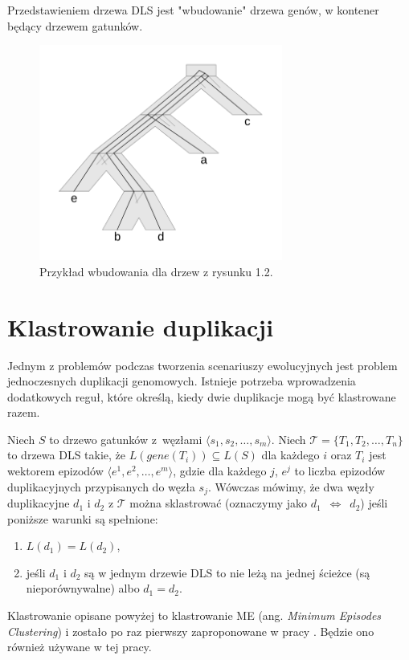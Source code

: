 \documentclass[licencjacka]{pracamgr}
\begin{document}
Przedstawieniem drzewa DLS jest "wbudowanie" drzewa genów, w kontener będący drzewem gatunków. 


\begin{figure}[H]
  \centering
  \includegraphics[width=80mm]{./pictures/optscen.png}
  \caption{Przykład wbudowania dla drzew z rysunku 1.2.}
\end{figure}

\section{Klastrowanie duplikacji}

Jednym z problemów podczas tworzenia scenariuszy ewolucyjnych jest problem jednoczesnych duplikacji genomowych. Istnieje potrzeba wprowadzenia dodatkowych reguł, które określą, kiedy dwie duplikacje mogą być klastrowane razem. 
 
Niech $S$ to drzewo gatunków z~węzłami $\langle s_1,s_2, \dots , s_m \rangle$.
Niech $\mathcal{T}=\{T_1,T_2, \dots , T_n\}$ to drzewa DLS takie, że $L(gene(T_i)) \subseteq L(S)$ dla każdego $i$ oraz $T_i$ jest wektorem epizodów $\langle e^1,e^2, \dots , e^m \rangle$, gdzie dla każdego $j$, $e^j$ to liczba epizodów duplikacyjnych przypisanych do węzła $s_j$. Wówczas mówimy, że dwa węzły duplikacyjne $d_1$ i $d_2$ z $\mathcal{T}$ można sklastrować (oznaczymy jako $d_1$~$\Longleftrightarrow$~$d_2$)  jeśli poniższe warunki są spełnione:
\begin{enumerate}
\item $L(d_1) = L({d_2})$,
\item jeśli $d_1$ i $d_2$ są w jednym drzewie DLS to nie leżą na jednej ścieżce (są nieporównywalne) albo $d_1=d_2$.
\end{enumerate}

Klastrowanie opisane powyżej to klastrowanie ME (ang. \textit{Minimum Episodes Clustering}) i zostało po raz pierwszy zaproponowane w pracy \cite{Guigo1996}. Będzie ono również używane w tej pracy.
\end{document}
